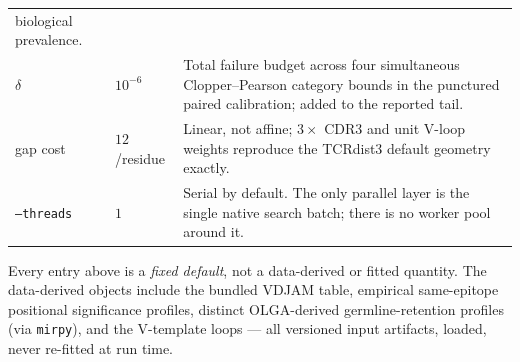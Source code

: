 \documentclass[10pt,a4paper]{article}
\theoremstyle{definition}
\newcommand{\code}[1]{\texttt{\small #1}}
\begin{document}
\begin{center}
\begin{tabular}{@{}llp{86mm}@{}}
biological prevalence.\\
$\delta$ & $10^{-6}$ & Total failure budget across four simultaneous Clopper--Pearson category
bounds in the punctured paired calibration; added to the reported tail.\\
gap cost & $12$/residue & Linear, not affine; $3\times$ CDR3 and unit V-loop weights reproduce the
TCRdist3 default geometry exactly.\\
\code{--threads} & $1$ & Serial by default. The only parallel layer is the single native search
batch; there is no worker pool around it.\\
\bottomrule
\end{tabular}
\end{center}

\noindent Every entry above is a \emph{fixed default}, not a data-derived or fitted quantity. The
data-derived objects include the bundled VDJAM table, empirical same-epitope positional
significance profiles, distinct OLGA-derived germline-retention profiles (via \texttt{mirpy}),
and the V-template loops --- all
versioned input artifacts, loaded, never re-fitted at run time.
\end{document}
